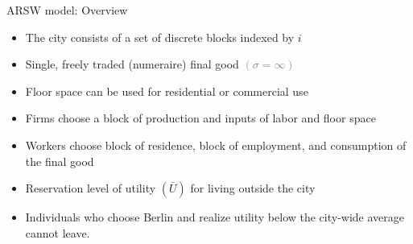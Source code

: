 \documentclass[11pt,notes=hide,aspectratio=169]{beamer}
\begin{document}
\begin{frame}{ARSW model: Overview}
\begin{itemize}
\item The city consists of a set of discrete blocks indexed by $i$ 
\item Single, freely traded (numeraire) final good \textcolor{gray}{$(\sigma = \infty)$}
\item Floor space can be used for residential or commercial use
\item Firms choose a block of production and inputs of labor and floor space 
\item Workers choose block of residence, block of employment, and consumption of the final good 
\item Reservation level of utility $(\bar{U})$ for living outside the city
\item[] {\small Individuals who choose Berlin and realize utility below the city-wide average cannot leave.\par}
\end{itemize}
\end{frame}
\end{document}
